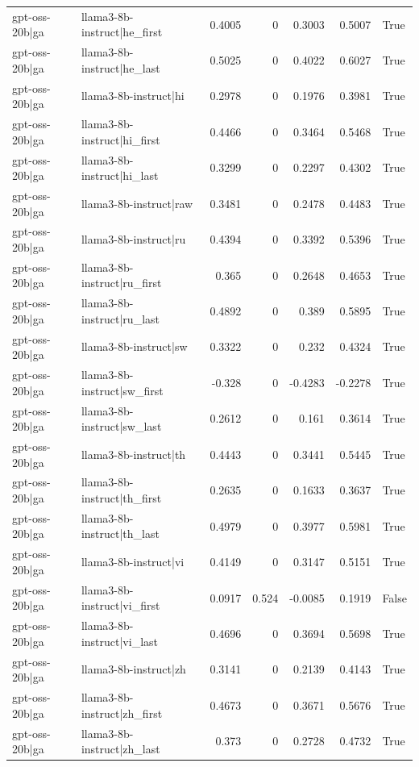 \begin{table}
\begin{tabular}{l l r r r r l}
gpt-oss-20b|ga & llama3-8b-instruct|he_first & 0.4005 & 0 & 0.3003 & 0.5007 & True \\
gpt-oss-20b|ga & llama3-8b-instruct|he_last & 0.5025 & 0 & 0.4022 & 0.6027 & True \\
gpt-oss-20b|ga & llama3-8b-instruct|hi & 0.2978 & 0 & 0.1976 & 0.3981 & True \\
gpt-oss-20b|ga & llama3-8b-instruct|hi_first & 0.4466 & 0 & 0.3464 & 0.5468 & True \\
gpt-oss-20b|ga & llama3-8b-instruct|hi_last & 0.3299 & 0 & 0.2297 & 0.4302 & True \\
gpt-oss-20b|ga & llama3-8b-instruct|raw & 0.3481 & 0 & 0.2478 & 0.4483 & True \\
gpt-oss-20b|ga & llama3-8b-instruct|ru & 0.4394 & 0 & 0.3392 & 0.5396 & True \\
gpt-oss-20b|ga & llama3-8b-instruct|ru_first & 0.365 & 0 & 0.2648 & 0.4653 & True \\
gpt-oss-20b|ga & llama3-8b-instruct|ru_last & 0.4892 & 0 & 0.389 & 0.5895 & True \\
gpt-oss-20b|ga & llama3-8b-instruct|sw & 0.3322 & 0 & 0.232 & 0.4324 & True \\
gpt-oss-20b|ga & llama3-8b-instruct|sw_first & -0.328 & 0 & -0.4283 & -0.2278 & True \\
gpt-oss-20b|ga & llama3-8b-instruct|sw_last & 0.2612 & 0 & 0.161 & 0.3614 & True \\
gpt-oss-20b|ga & llama3-8b-instruct|th & 0.4443 & 0 & 0.3441 & 0.5445 & True \\
gpt-oss-20b|ga & llama3-8b-instruct|th_first & 0.2635 & 0 & 0.1633 & 0.3637 & True \\
gpt-oss-20b|ga & llama3-8b-instruct|th_last & 0.4979 & 0 & 0.3977 & 0.5981 & True \\
gpt-oss-20b|ga & llama3-8b-instruct|vi & 0.4149 & 0 & 0.3147 & 0.5151 & True \\
gpt-oss-20b|ga & llama3-8b-instruct|vi_first & 0.0917 & 0.524 & -0.0085 & 0.1919 & False \\
gpt-oss-20b|ga & llama3-8b-instruct|vi_last & 0.4696 & 0 & 0.3694 & 0.5698 & True \\
gpt-oss-20b|ga & llama3-8b-instruct|zh & 0.3141 & 0 & 0.2139 & 0.4143 & True \\
gpt-oss-20b|ga & llama3-8b-instruct|zh_first & 0.4673 & 0 & 0.3671 & 0.5676 & True \\
gpt-oss-20b|ga & llama3-8b-instruct|zh_last & 0.373 & 0 & 0.2728 & 0.4732 & True \\

\end{tabular}
\end{table}
